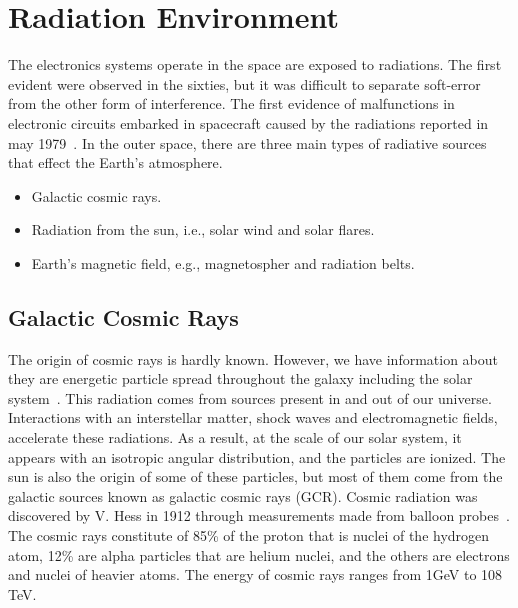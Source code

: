 \section{Radiation Environment}


The electronics systems operate in the space are exposed to radiations. The first evident were observed in the sixties, but it was difficult to separate soft-error from the other form of interference. The first evidence of malfunctions in electronic circuits embarked in spacecraft caused by the radiations reported in may 1979~\cite{may1979alpha}. In the outer space, there are three main types of radiative sources that effect the Earth's atmosphere.

\begin{itemize}

\item Galactic cosmic rays.

\item Radiation from the sun, i.e., solar wind and solar flares.

\item Earth's magnetic field, e.g., magnetospher and radiation belts.

\end{itemize}


\subsection{Galactic Cosmic Rays} 

The origin of cosmic rays is hardly known. However, we have information about they are energetic particle spread throughout the galaxy including the solar system~\cite{SWE20216}. This radiation comes from sources present in and out of our
universe. Interactions with an interstellar matter, shock waves and electromagnetic fields, accelerate these radiations. As a result, at the scale of our
solar system, it appears with an isotropic angular distribution, and the particles are ionized. The sun is also the origin of some of these particles, but most of them come from the galactic sources known as galactic cosmic rays (GCR).
Cosmic radiation was discovered by V. Hess in 1912 through measurements made from balloon probes~\cite{cronin1999cosmic}. The cosmic rays constitute of 85\% of the proton that is nuclei of the hydrogen atom, 12\% are alpha particles that are helium nuclei, and the others are electrons and nuclei of heavier atoms. The energy of cosmic rays ranges from 1GeV to 108 TeV. 


